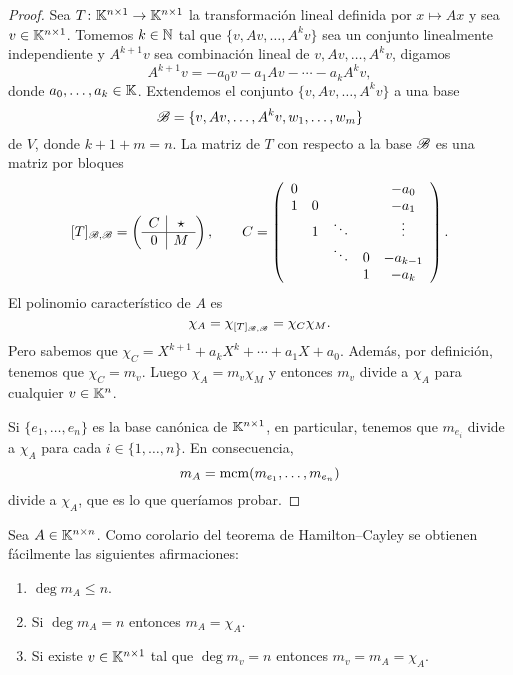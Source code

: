 \begin{proof}
	Sea $T\colon\mathbb{K}^{n\times1}\to\mathbb{K}^{n\times1}$ la transformación lineal
	definida por $x\mapsto Ax$ y sea $v\in\mathbb{K}^{n\times1}$.  Tomemos $k\in\mathbb{N}$ tal
	que $\{v,Av,\dots,A^kv\}$ sea un conjunto linealmente independiente y
	$A^{k+1}v$ sea combinación lineal de $v,Av,\dots,A^kv$, digamos 
	\[
	A^{k+1}v=-a_0v-a_1Av-\cdots-a_kA^kv, 
	\]
	donde $a_0,\dots,a_k\in\mathbb{K}$.
	Extendemos el conjunto $\{v,Av,\dots,A^kv\}$ a una base 
	\[
	\mathscr{B}=\{v,Av,\dots,A^kv,w_1,\dots,w_m\}
	\]
	de $V$, donde $k+1+m=n$. La matriz de $T$ con respecto a la base $\mathscr{B}$ es
	una matriz por bloques
	\[
	[T]_{\mathscr{B},\mathscr{B}}=\left(\begin{array}{c|c}
		C & \star\\
		\hline
		0 & M
	\end{array}\right),\qquad
	C=\left(\begin{array}{ccccc}
		0 &  &  &  & -a_{0}\\
		1 & 0 &  &  & -a_{1}\\
		& 1 & \ddots &  & \vdots\\
		&  & \ddots & 0 & -a_{k-1}\\
		&  &  & 1 & -a_{k}
	\end{array}\right).
	\]
	El polinomio característico de $A$ es 
	\[
	\chi_A=\chi_{[T]_{\mathscr{B},\mathscr{B}}}=\chi_C\chi_M.
	\]
	Pero sabemos que $\chi_C=X^{k+1}+a_{k}X^{k}+\cdots+a_1X+a_0$. Además, por
	definición, tenemos que $\chi_C=m_v$.  Luego $\chi_A=m_v\chi_M$ y entonces
	$m_v$ divide a $\chi_A$ para cualquier $v\in\mathbb{K}^n$. 
	
	Si $\{e_1,\dots,e_n\}$ es la base canónica de $\mathbb{K}^{n\times1}$, en particular, tenemos
	que $m_{e_i}$ divide a $\chi_A$ para cada $i\in\{1,\dots,n\}$. En
	consecuencia, \[
		m_A=\mathrm{mcm}(m_{e_1},\dots,m_{e_n})
	\]
	divide a $\chi_A$, que es lo
	que queríamos probar.
\end{proof}

\begin{block}
	Sea $A\in\mathbb{K}^{n\times n}$. Como corolario del teorema de Hamilton--Cayley 
	se obtienen fácilmente las siguientes afirmaciones:
	\begin{enumerate}
		\item $\deg m_A\leq n$.
		\item Si $\deg m_A=n$ entonces $m_A=\chi_A$.
		\item Si existe $v\in\mathbb{K}^{n\times1}$ tal que $\deg m_v=n$ entonces $m_v=m_A=\chi_A$.
	\end{enumerate}
\end{block}

